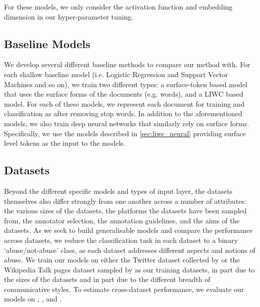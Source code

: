 For these models, we only consider the activation function and embedding dimension in our hyper-parameter tuning.

\subsection{Baseline Models}

We develop several different baseline methods to compare our method with. For each shallow baseline model (i.e. Logistic Regression and Support Vector Machines and so on), we train two different types: a surface-token based model that uses the surface forms of the documents (e.g. words), and a LIWC based model. For each of these models, we represent each document for training and classification as  after removing stop words. In addition to the aforementioned models, we also train deep neural networks that similarly rely on surface forms. Specifically, we use the models described in \autoref{sec:liwc_neural} providing surface level tokens as the input to the models.

\subsection{Datasets}
Beyond the different specific models and types of input layer, the datasets themselves also differ strongly from one another across a number of attributes: the various sizes of the datasets, the platforms the datasets have been sampled from, the annotator selection, the annotation guidelines, and the aims of the datasets. As we seek to build generalisable models and compare the performance across datasets, we reduce the classification task in each dataset to a binary `abuse/not-abuse' class, as each dataset addresses different aspects and notions of abuse.
We train our models on either the Twitter dataset collected by \citet{Davidson:2017} or the Wikipedia Talk pages dataset sampled by \citet{Wulczyn:2017} as our training datasets, in part due to the sizes of the datasets and in part due to the different breadth of communicative styles. To estimate cross-dataset performance, we evaluate our models on \citet{Waseem-Hovy:2016}, \citet{Waseem:2016}, and \citet{Garcia:2019}.


